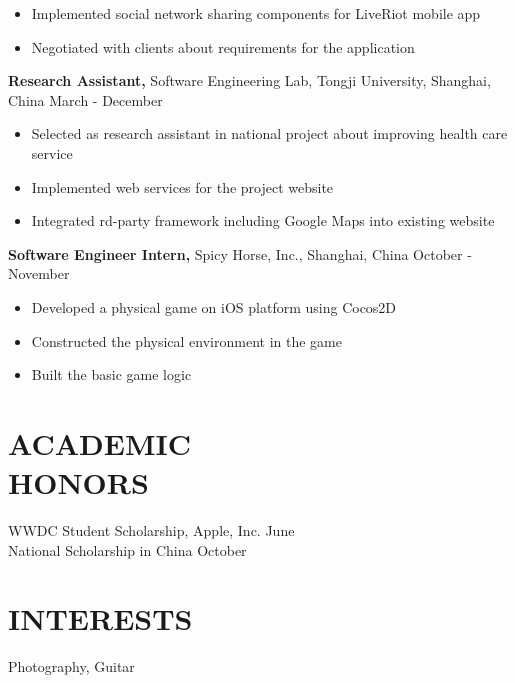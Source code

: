 \documentclass[line, overlapped]{res}
\begin{document}
\begin{resume}
\begin{itemize}
  \item Implemented social network sharing components for LiveRiot mobile app 
  
  \item Negotiated with clients about requirements for the application

\end{itemize}

{\bf Research Assistant,} Software Engineering Lab, Tongji University, Shanghai, China \hfill March  - December  
\begin{itemize} \itemsep -2pt
              
  \item Selected as research assistant in national project about improving health care service
  
  \item Implemented web services for the project website
  
  \item Integrated rd-party framework including Google Maps into existing website
    
\end{itemize}

{\bf Software Engineer Intern,} Spicy Horse, Inc., Shanghai, China \hfill October  - November 
\begin{itemize} \itemsep -2pt
 
  \item Developed a physical game on iOS platform using Cocos2D
  
  \item Constructed the physical environment in the game
  
  \item Built the basic game logic
  
\end{itemize}

\section{ACADEMIC \\ HONORS} 
WWDC  Student Scholarship, Apple, Inc. \hfill June  \\
National Scholarship in China \hfill October  \\

\section{INTERESTS}
Photography, Guitar

\end{resume} 
\end{document}
